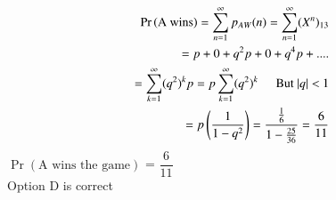 \documentclass[journal,12pt,twocolumn]{IEEEtran}
\theoremstyle{definition}
\providecommand{\pr}[1]{\ensuremath{\Pr\left(#1\right)}}
\numberwithin{equation}{subsection}
\begin{document}
\onehalfspacing
\begin{align*}
    \pr{\text{A wins}} = \sum_{n=1}^{\infty} p_{AW}(n)
     = \sum_{n=1}^{\infty} (X^n)_{13}\\
    = p + 0 + q^2p + 0 + q^4p + ....\\
    = \sum_{k=1}^{\infty} (q^2)^k p
    = p \sum_{k=1}^{\infty} (q^2)^k \hspace{0.5cm} \text{But $|q| <$ 1}\\
    = p \left(\dfrac{1}{1 - q^2}\right)
    =\dfrac{\frac{1}{6}}{1 - \frac{25}{36}} = \dfrac{6}{11}
\end{align*}
\centering \Large
\pr{\text{A wins the game}} = $\dfrac{6}{11}$\\
Option D is correct
\end{document}
